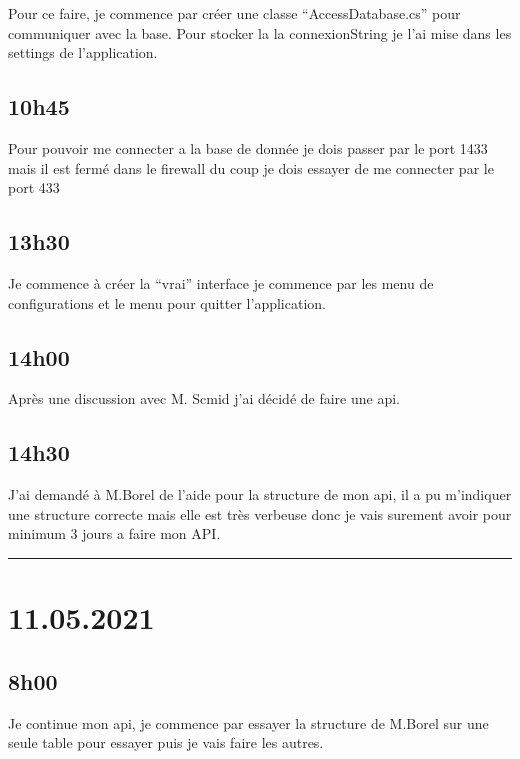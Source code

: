 \documentclass[a4paper,12pt,french]{sphinxmanual}
\begin{document}
\sphinxAtStartPar
Pour ce faire, je commence par créer une classe “AccessDatabase.cs” pour communiquer avec la base. Pour stocker la la connexionString je l’ai mise dans les settings de l’application.


\subsection{10h45}
\label{\detokenize{logbook:id92}}
\sphinxAtStartPar
Pour pouvoir me connecter a la base de donnée je dois passer par le port 1433 mais il est fermé dans le firewall du coup je dois essayer de me connecter par le port 433


\subsection{13h30}
\label{\detokenize{logbook:id93}}
\sphinxAtStartPar
Je commence à créer la “vrai” interface je commence par les menu de configurations et le menu pour quitter l’application.


\subsection{14h00}
\label{\detokenize{logbook:id94}}
\sphinxAtStartPar
Après une discussion avec M. Scmid j’ai décidé de faire une api.


\subsection{14h30}
\label{\detokenize{logbook:id95}}
\sphinxAtStartPar
J’ai demandé à M.Borel de l’aide pour la structure de mon api, il a pu m’indiquer une structure correcte mais elle est très verbeuse donc je vais surement avoir pour minimum 3 jours a faire mon API.


\bigskip\hrule\bigskip



\section{11.05.2021}
\label{\detokenize{logbook:id96}}

\subsection{8h00}
\label{\detokenize{logbook:id97}}
\sphinxAtStartPar
Je continue mon api, je commence par essayer la structure de M.Borel sur une seule table pour essayer puis je vais faire les autres.
\end{document}
